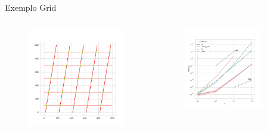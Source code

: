 \documentclass[aspectratio=169,usenames,dvipsnames]{beamer}
\begin{document}
\begin{frame}{Exemplo Grid}
  \begin{columns}
    \begin{column}{0.35\textwidth}
      \begin{figure}
        \includegraphics[width=\textwidth]{figs/exemplos/grid_example_10_interserctions.pdf}
      \end{figure}
    \end{column}
    \begin{column}{0.65\textwidth}
      \begin{figure}
        \includegraphics[width=0.8\textwidth]{figs/tempos/plot_grid_time.pdf}
      \end{figure}
    \end{column}
  \end{columns}
\end{frame}
\end{document}
